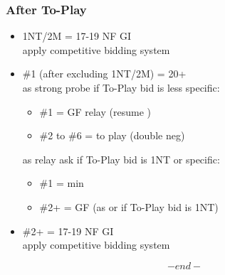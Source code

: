 \documentclass{article}
\begin{document}
\begin{multicols}{2}
\subsubsection{After To-Play}
\begin{itemize}
    \setlength\itemsep{-0.2em}
    \item 1NT/2M = 17-19 NF GI \\
        apply competitive bidding system
    \item \#1 (after excluding 1NT/2M) = 20+ \\
        as strong probe if To-Play bid is less specific:
        \begin{itemize}
            \setlength\itemsep{-0.2em}
            \item \#1 = GF relay (resume )
            \item \#2 to \#6 = to play (double neg)
        \end{itemize}
        as relay ask if To-Play bid is 1NT or specific:
        \begin{itemize}
            \setlength\itemsep{-0.2em}
            \item \#1 = min
            \item \#2+ = GF (as  or
                 if To-Play bid is 1NT)
        \end{itemize}
    \item \#2+ = 17-19 NF GI \\
        apply competitive bidding system
\end{itemize}

\columnbreak

$$ -end- $$

\end{multicols}
\end{document}
